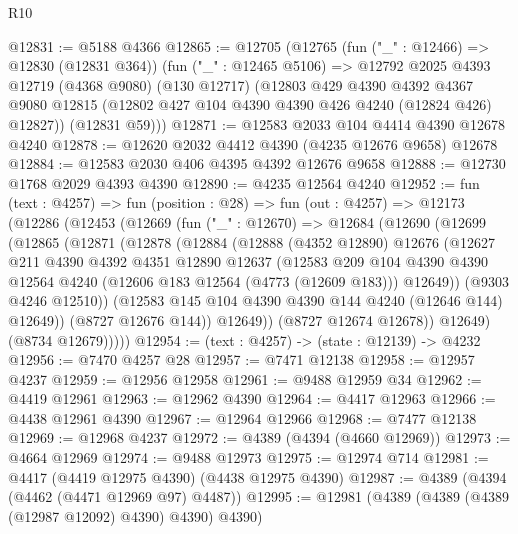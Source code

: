 \begin{lexlean}{R10}
\begin{coremodule}
@12831 := @5188 @4366
@12865 := @12705
    (@12765
      (fun ("_" : @12466) => @12830 (@12831 @364))
      (fun ("_" : @12465 @5106) =>
      @12792
        @2025
        @4393
        @12719
        (@4368 @9080)
        (@130 @12717)
        (@12803
          @429
          @4390
          @4392
          @4367
          @9080
          @12815
          (@12802 @427 @104 @4390 @4390 @426 @4240 (@12824 @426) @12827))
        (@12831 @59)))
@12871 := @12583 @2033 @104 @4414 @4390 @12678 @4240
@12878 := @12620 @2032 @4412 @4390 (@4235 @12676 @9658) @12678
@12884 := @12583 @2030 @406 @4395 @4392 @12676 @9658
@12888 := @12730 @1768 @2029 @4393 @4390
@12890 := @4235 @12564 @4240
@12952 := fun (text : @4257) =>
  fun (position : @28) =>
  fun (out : @4257) =>
  @12173
    (@12286
      (@12453
        (@12669
          (fun ("_" : @12670) =>
          @12684
            (@12690
              (@12699
                (@12865
                  (@12871
                    (@12878
                      (@12884
                        (@12888
                          (@4352 @12890)
                          @12676
                          (@12627
                            @211
                            @4390
                            @4392
                            @4351
                            @12890
                            @12637
                            (@12583
                              @209
                              @104
                              @4390
                              @4390
                              @12564
                              @4240
                              (@12606 @183 @12564 (@4773 (@12609 @183)))
                              @12649))
                          (@9303 @4246 @12510))
                        (@12583 @145 @104 @4390 @4390 @144 @4240 (@12646 @144) @12649))
                      (@8727 @12676 @144))
                    @12649))
                (@8727 @12674 @12678))
              @12649)
            (@8734 @12679)))))
@12954 := (text : @4257) -> (state : @12139) -> @4232
@12956 := @7470 @4257 @28
@12957 := @7471 @12138
@12958 := @12957 @4237
@12959 := @12956 @12958
@12961 := @9488 @12959 @34
@12962 := @4419 @12961
@12963 := @12962 @4390
@12964 := @4417 @12963
@12966 := @4438 @12961 @4390
@12967 := @12964 @12966
@12968 := @7477 @12138
@12969 := @12968 @4237
@12972 := @4389 (@4394 (@4660 @12969))
@12973 := @4664 @12969
@12974 := @9488 @12973
@12975 := @12974 @714
@12981 := @4417 (@4419 @12975 @4390) (@4438 @12975 @4390)
@12987 := @4389 (@4394 (@4462 (@4471 @12969 @97) @4487))
@12995 := @12981 (@4389 (@4389 (@4389 (@12987 @12092) @4390) @4390) @4390)

\end{coremodule}
\end{lexlean}
